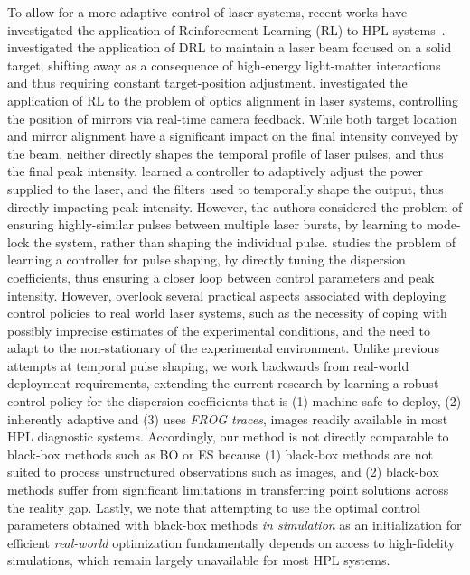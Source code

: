To allow for a more adaptive control of laser systems, recent works have investigated the application of Reinforcement Learning (RL) to HPL systems~\citep{kuprikov2022deep, rakhmatulin2024reinforcement, mareev2023self, capuano2023temporl}. 
\citet{mareev2023self} investigated the application of DRL to maintain a laser beam focused on a solid target, shifting away as a consequence of high-energy light-matter interactions and thus requiring constant target-position adjustment. 
\cite{rakhmatulin2024reinforcement} investigated the application of RL to the problem of optics alignment in laser systems, controlling the position of mirrors via real-time camera feedback. 
While both target location and mirror alignment have a significant impact on the final intensity conveyed by the beam, neither directly shapes the temporal profile of laser pulses, and thus the final peak intensity. 
\cite{kuprikov2022deep} learned a controller to adaptively adjust the power supplied to the laser, and the filters used to temporally shape the output, thus directly impacting peak intensity. 
However, the authors considered the problem of ensuring highly-similar pulses between multiple laser bursts, by learning to mode-lock the system, rather than shaping the individual pulse. 
\cite{capuano2023temporl} studies the problem of learning a controller for pulse shaping, by directly tuning the dispersion coefficients, thus ensuring a closer loop between control parameters and peak intensity. 
However, \cite{capuano2023temporl} overlook several practical aspects associated with deploying control policies to real world laser systems, such as the necessity of coping with possibly imprecise estimates of the experimental conditions, and the need to adapt to the non-stationary of the experimental environment.
Unlike previous attempts at temporal pulse shaping, we work backwards from real-world deployment requirements, extending the current research by learning a robust control policy for the dispersion coefficients that is (1) machine-safe to deploy, (2) inherently adaptive and (3) uses \textit{FROG traces}, images readily available in most HPL diagnostic systems.
Accordingly, our method is not directly comparable to black-box methods such as BO or ES because (1) black-box methods are not suited to process unstructured observations such as images, and (2) black-box methods suffer from significant limitations in transferring point solutions across the reality gap.
Lastly, we note that attempting to use the optimal control parameters obtained with black-box methods \textit{in simulation} as an initialization for efficient \textit{real-world} optimization fundamentally depends on access to high-fidelity simulations, which remain largely unavailable for most HPL systems.



